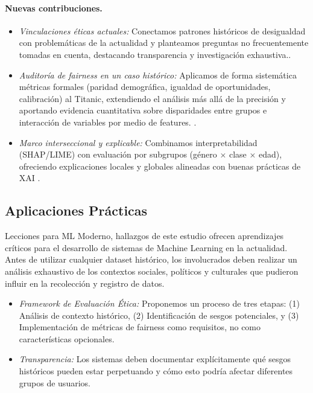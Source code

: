 \documentclass[conference]{IEEEtran}
\begin{document}
\paragraph{Nuevas contribuciones.}
\begin{itemize}
    \item \emph{Vinculaciones éticas actuales:} Conectamos patrones históricos de desigualdad con problemáticas de la actualidad y planteamos preguntas no frecuentemente tomadas en cuenta, destacando transparencia y investigación exhaustiva.\cite{jobin2019global,floridi2018ai4people,russell2019human,angwin2016machine}.
    \item \emph{Auditoría de \emph{fairness} en un caso histórico:} Aplicamos de forma sistemática métricas formales (paridad demográfica, igualdad de oportunidades, calibración) al Titanic, extendiendo el análisis más allá de la precisión y aportando evidencia cuantitativa sobre disparidades entre grupos e interacción de variables por medio de features. \cite{hardt2016equality,verma2018fairness,mitchell2021algorithmic}.
    \item \emph{Marco interseccional y explicable:} Combinamos interpretabilidad (SHAP/LIME) con evaluación por subgrupos (género $\times$ clase $\times$ edad), ofreciendo explicaciones locales y globales alineadas con buenas prácticas de XAI \cite{lundberg2017unified,ribeiro2016should,molnar2020interpretable,miller2019interpretable}.
\end{itemize}

\subsection{Aplicaciones Prácticas}
Lecciones para ML Moderno, hallazgos de este estudio ofrecen aprendizajes críticos para el desarrollo de sistemas de Machine Learning en la actualidad. Antes de utilizar cualquier dataset histórico, los involucrados deben realizar un análisis exhaustivo de los contextos sociales, políticos y culturales que pudieron influir en la recolección y registro de datos.
\begin{itemize}
    \item \emph{Framework de Evaluación Ética:} Proponemos un proceso de tres etapas: (1) Análisis de contexto histórico, (2) Identificación de sesgos potenciales, y (3) Implementación de métricas de fairness como requisitos, no como características opcionales.
    \item \emph{Transparencia:} Los sistemas deben documentar explícitamente qué sesgos históricos pueden estar perpetuando y cómo esto podría afectar diferentes grupos de usuarios.
\end{itemize}
\end{document}
